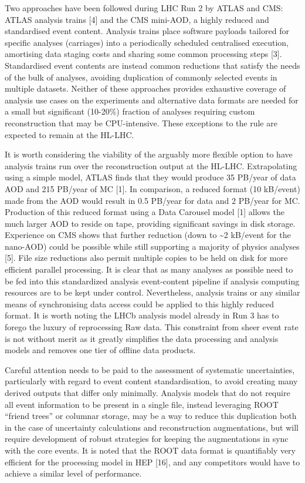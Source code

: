 \documentclass[10pt,a4paper]{article}
\begin{document}
Two approaches have been followed during LHC Run 2 by ATLAS and CMS:
ATLAS analysis trains {[}4{]} and the CMS mini-AOD, a highly reduced and
standardised event content. Analysis trains place software payloads
tailored for specific analyses (carriages) into a periodically scheduled
centralised execution, amortising data staging costs and sharing some
common processing steps {[}3{]}. Standardised event contents are instead
common reductions that satisfy the needs of the bulk of analyses,
avoiding duplication of commonly selected events in multiple datasets.
Neither of these approaches provides exhaustive coverage of analysis use
cases on the experiments and alternative data formats are needed for a
small but significant (10-20\%) fraction of analyses requiring custom
reconstruction that may be CPU-intensive. These exceptions to the rule
are expected to remain at the HL-LHC.

It is worth considering the viability of the arguably more flexible
option to have analysis trains run over the reconstruction output at the
HL-LHC. Extrapolating using a simple model, ATLAS finds that they would
produce 35 PB/year of data AOD and 215 PB/year of MC {[}1{]}. In
comparison, a reduced format (10 kB/event) made from the AOD would
result in 0.5 PB/year for data and 2 PB/year for MC. Production of this
reduced format using a Data Carousel model {[}1{]} allows the much
larger AOD to reside on tape, providing significant savings in disk
storage. Experience on CMS shows that further reduction (down to
\textasciitilde2 kB/event for the nano-AOD) could be possible while
still supporting a majority of physics analyses {[}5{]}. File size
reductions also permit multiple copies to be held on disk for more
efficient parallel processing. It is clear that as many analyses as
possible need to be fed into this standardized analysis event-content
pipeline if analysis computing resources are to be kept under control.
Nevertheless, analysis trains or any similar means of synchronising data
access could be applied to this highly reduced format. It is worth
noting the LHCb analysis model already in Run 3 has to forego the luxury
of reprocessing Raw data. This constraint from sheer event rate is not
without merit as it greatly simplifies the data processing and analysis
models and removes one tier of offline data products.

Careful attention needs to be paid to the assessment of systematic
uncertainties, particularly with regard to event content
standardisation, to avoid creating many derived outputs that differ only
minimally. Analysis models that do not require all event information to
be present in a single file, instead leveraging ROOT ``friend trees'' or
columnar storage, may be a way to reduce this duplication both in the
case of uncertainty calculations and reconstruction augmentations, but
will require development of robust strategies for keeping the
augmentations in sync with the core events. It is noted that the ROOT
data format is quantifiably very efficient for the processing model in
HEP {[}16{]}, and any competitors would have to achieve a similar level
of performance.
\end{document}
